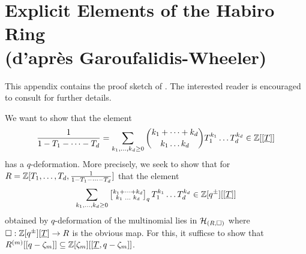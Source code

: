 \section{Explicit Elements of the Habiro Ring \\ (d'apr\`{e}s Garoufalidis-Wheeler)}\label{appdx: explicit elements}
This appendix contains the proof sketch of . The interested reader is encouraged to consult \cite{GWClassesHabiroCoh} for further details. 

We want to show that the element 
$$\frac{1}{1-T_{1}-\dots-T_{d}}=\sum_{k_{1},\dots,k_{d}\geq0}\binom{k_{1}+\dots+k_{d}}{k_{1} \dots k_{d}}T_{1}^{k_{1}}\dots T_{d}^{k_{d}}\in\mathbb{Z}[[\underline{T}]]$$
has a $q$-deformation. More precisely, we seek to show that for $R=\mathbb{Z}[T_{1},\dots,T_{d},\frac{1}{1-T_{1}-\dots-T_{d}}]$ that the element 
\begin{equation}\label{eqn: Habiro element}
    \sum_{k_{1},\dots,k_{d}\geq0}\left[\substack{k_{1}+\dots+k_{d} \\ k_{1}\text{ }\dots\text{ }k_{d}}\right]_{q}T_{1}^{k_{1}}\dots T_{d}^{k_{d}}\in\mathbb{Z}[q^{\pm}][[\underline{T}]]
\end{equation}
obtained by $q$-deformation of the multinomial lies in $\mathcal{H}_{(R,\square)}$ where $\square:\mathbb{Z}[q^{\pm}][\underline{T}]\to R$ is the obvious map. For this, it sufficse to show that $R^{(m)}[[q-\zeta_{m}]]\subseteq\mathbb{Z}[\zeta_{m}][[\underline{T},q-\zeta_{m}]]$. 

